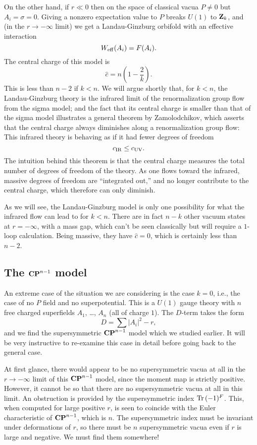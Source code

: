 On the other hand, if $r\ll0$ then on the space of classical vacua $P\ne0$
but $A_i=\sigma=0$.  Giving a nonzero expectation value to $P$ breaks
$U(1)$ to ${\bf Z}_k$, and (in the $r\to-\infty$ limit) we get a
Landau-Ginzburg orbifold with an effective interaction
$$W_{\rm eff}(A_i)=F(A_i).$$
The central charge of this model is
$$\widehat{c}=n(1-\frac2k).$$
This is less than $n-2$ if $k<n$.
We will argue shortly that, for $k<n$, the Landau-Ginzburg theory
is the infrared limit of the renormalization group flow from the sigma model;
and the fact that its central charge is smaller than that of the sigma
model illustrates a general theorem by Zamolodchikov, which asserts
that the central charge always diminishes along a renormalization group flow:
This infrared theory is behaving as if it had fewer degrees of freedom
$$c_{\rm IR}\le c_{\rm UV}.$$
The intuition behind this theorem is that the central charge measures
the total number of degrees of freedom of the theory.  As one flows
toward the infrared, massive degrees of freedom are ``integrated out,'' and
no longer contribute to the central charge, which therefore can only
diminish.


As we will see, the Landau-Ginzburg model is only one possibility for
what the infrared flow can lead to for $k<n$.
 There are in fact $n-k$ other vacuum states at $r=-\infty$, with a
mass gap, which can't be seen classically but will require a $1$-loop
calculation.  Being massive, they have $\widehat c =0$, which is certainly
less than $n-2$.

\subsection{The ${\bf CP}^{n-1}$ model}

An extreme case of the situation we are considering is the case $k=0$,
i.e., the case of no $P$ field and no superpotential.  This is a $U(1)$
gauge theory with $n$ free charged superfields $A_1$, \dots, $A_n$ (all of
charge $1$).  The $D$-term takes the form
$$D=\sum|A_i|^2-r,$$
and we find the supersymmetric ${\bf CP}^{n-1}$ model which we studied
earlier.  It will be very instructive to re-examine this case in detail
before going back to the general case.

At first glance, there would appear to be no supersymmetric
vacua at all in the
$r\to-\infty$ limit of this ${\bf CP}^{n-1}$ model, since the moment
map is strictly positive.  However, it cannot
be so that there are no supersymmetric vacua at all in this limit.
An obstruction is provided by the supersymmetric index $\mathop{\rm Tr}\nolimits\,(-1)^F$.
This, when computed for large positive $r$, is seen to coincide with the
Euler characteristic of ${\bf CP}^{n-1}$, which is $n$.  The supersymmetric
index must be invariant under deformations of $r$, so there must
be $n$ supersymmetric vacua even if $r$ is large and negative.
We must find them somewhere!

